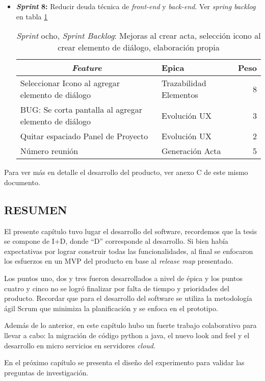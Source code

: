 \begin{itemize}
	\item \textbf{\textit{Sprint} 8:} Reducir deuda técnica de \textit{front-end} y \textit{back-end}. Ver \textit{spring backlog} en tabla \ref{tab:backlog8}

\begin{table}[!h]
\centering
\caption{\textit{Sprint} ocho, \textit{Sprint Backlog}: Mejoras al crear acta, selección icono al crear elemento de diálogo, elaboración propia}
\label{tab:backlog8}
\begin{tabular}{|l|l|r|}
\hline
\multicolumn{1}{|c|}{\textit{\textbf{Feature}}} & \textbf{Epica} & \textbf{Peso} \\ \hline
Seleccionar Icono al agregar elemento de diálogo & Trazabilidad Elementos & 8 \\ \hline
BUG: Se corta pantalla al agregar elemento de diálogo & Evolución UX & 3 \\ \hline
Quitar espaciado Panel de Proyecto & Evolución UX & 2 \\ \hline
Número reunión & Generación Acta & 5 \\ \hline
\end{tabular}
\end{table}

\end{itemize}

Para ver más en detalle el desarrollo del producto, ver anexo C de este mismo documento.

\subsection{RESUMEN}

El presente capítulo tuvo lugar el desarrollo del software, recordemos que la tesis se compone de I+D, donde “D” corresponde al desarrollo. Si bien había expectativas por lograr construir todas las funcionalidades, al final se enfocaron los esfuerzos en un MVP del producto en base al \textit{release map} presentado.

Los puntos uno, dos y tres fueron desarrollados a nivel de épica y los puntos cuatro y cinco no se logró finalizar por falta de tiempo y prioridades del producto. Recordar que para el desarrollo del software se utiliza la metodología ágil Scrum que minimiza la planificación y se enfoca en el prototipo.

Además de lo anterior, en este capítulo hubo un fuerte trabajo colaborativo para llevar a cabo: la migración de código python a java, el nuevo look and feel y el desarrollo en micro servicios en servidores \textit{cloud}.

En el próximo capítulo se presenta el diseño del experimento para validar las preguntas de investigación.
